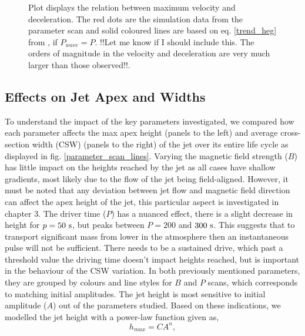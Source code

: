 \documentclass[12pt]{ociamthesis}
\newcommand{\fref}[1]{fig. \ref{#1}}
\begin{document}
\begin{figure}
\captionsetup[subfigure]{labelformat=empty}
\centering
{}
\caption{Plot displays the relation between maximum velocity and deceleration. The red dots are the simulation data from the parameter scan and solid coloured lines are based on eq. \eqref{trend_heg} from \cite{Heggland2007ApJ6661277H}, if $P_{wave}=P$. {\color{green}!!Let me know if I should include this. The orders of magnitude in the velocity and deceleration are very much larger than those observed!!}.}
\label{decell}
\end{figure}
\subsection{Effects on Jet Apex and Widths}
\label{subsec:jet_apex_widths}
To understand the impact of the key parameters investigated, we compared how each parameter affects the max apex height (panels to the left) and average cross-section width (CSW) (panels to the right) of the jet over its entire life cycle as displayed in \fref{parameter_scan_lines}. Varying the magnetic field strength ($B$) has little impact on the heights reached by the jet as all cases have shallow gradients, most likely due to the flow of the jet being field-aligned. However, it must be noted that any deviation between jet flow and magnetic field direction can affect the apex height of the jet, this particular aspect is investigated in chapter 3. The driver time ($P$) has a nuanced effect, there is a slight decrease in height for $p=50~\rm{s}$, but peaks between $P=200$ and $300~\rm{s}$. This suggests that to transport significant mass from lower in the atmosphere then an instantaneous pulse will not be sufficient. There needs to be a sustained drive, which past a threshold value the driving time doesn't impact heights reached, but is important in the behaviour of the CSW variation. In both previously mentioned parameters, they are grouped by colours and line styles for $B$ and $P$ scans, which corresponds to matching initial amplitudes. The jet height is most sensitive to initial amplitude ($A$) out of the parameters studied. Based on these indications, we modelled the jet height with a power-law function given as,  
\begin{equation}
h_{max} = C A^{n},
\end{equation}
\end{document}

